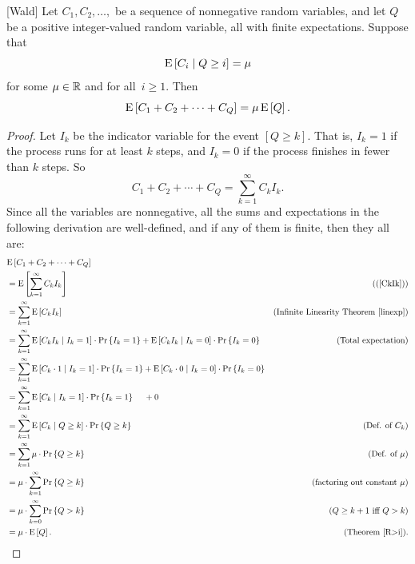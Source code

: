 \documentclass[11pt,twoside]{article}
\begin{document}
\begin{theorem} \label{wald} [Wald]
Let $C_1, C_2, \dots,$ be a sequence of nonnegative random variables, and
let $Q$ be a positive integer-valued random variable, all with finite
expectations.  Suppose that
\[
\mathop{\textup{E}}\nolimits\left[ C_i\mid Q \geq i\right] = \mu
\]
for some $\mu \in \mathbb{R}$ and for all~$i \geq 1$.  Then
\[
\mathop{\textup{E}}\nolimits\left[C_1 + C_2 + \cdots + C_Q\right] = \mu \mathop{\textup{E}}\nolimits\left[Q\right].
\]
\end{theorem}
\begin{proof}

Let $I_k$ be the indicator variable for the event $[Q \geq k]$.  That is,
$I_k = 1$ if the process runs for at least $k$ steps, and $I_k = 0$ if the
process finishes in fewer than $k$ steps.  So
\begin{equation}\label{CkIk}
    C_1 + C_2 + \cdots + C_Q = \sum_{k = 1}^\infty C_k I_k.
\end{equation}
Since all the variables are nonnegative, all the sums and expectations in
the following derivation are well-defined, and if any of them is finite,
then they all are:
\begin{align*}
\lefteqn{\expect{C_1 + C_2 + \cdots + C_Q}}\\
        &= \expect{\sum_{k = 1}^\infty C_k I_k}
                & \text{((\ref{CkIk}))}\\
        &= \sum_{k = 1}^\infty \expect{C_k I_k} 
                   &\text{(Infinite Linearity Theorem~\ref{linexp})}\\
        &= \sum_{k = 1}^\infty \expcond{C_k I_k}{I_k = 1} \cdot \prob{I_k = 1}
                                + \expcond{C_k I_k}{I_k = 0} \cdot
        \prob{I_k = 0}
            & \text{(Total expectation)}\\
        &= \sum_{k = 1}^\infty \expcond{C_k \cdot 1}{I_k = 1} \cdot \prob{I_k = 1}
                     + \expcond{C_k \cdot 0}{I_k = 0} \cdot \prob{I_k = 0}\\
        &= \sum_{k = 1}^\infty \expcond{C_k}{I_k = 1} \cdot \prob{I_k = 1} \quad\ + 0\\
        &= \sum_{k = 1}^\infty \expcond{C_k}{Q \geq k} \cdot \prob{Q \geq k} 
                & \text{(Def. of $C_k$)}\\
        &= \sum_{k = 1}^\infty \mu \cdot \prob{Q \geq k} 
                & \text{(Def. of $\mu$)}\\
        &= \mu \cdot \sum_{k = 1}^\infty \prob{Q \geq k}
                  & \text{(factoring out constant $\mu$)}\\
        &= \mu \cdot \sum_{k = 0}^\infty \prob{Q > k}
                  & \text{($Q\geq k+1$ iff $Q>k$)}\\
        &= \mu \cdot \expect{Q}.  & \text{(Theorem~\ref{R>i})}.
\end{align*}

\end{proof}
\end{document}
